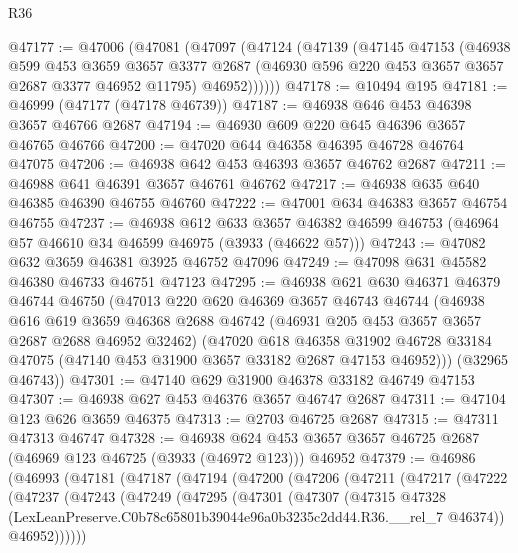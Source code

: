 \begin{lexlean}{R36}
\begin{coremodule}
@47177 := @47006
    (@47081
      (@47097
        (@47124
          (@47139
            (@47145
              @47153
              (@46938
                @599
                @453
                @3659
                @3657
                @3377
                @2687
                (@46930 @596 @220 @453 @3657 @3657 @2687 @3377 @46952 @11795)
                @46952))))))
@47178 := @10494 @195
@47181 := @46999 (@47177 (@47178 @46739))
@47187 := @46938 @646 @453 @46398 @3657 @46766 @2687
@47194 := @46930 @609 @220 @645 @46396 @3657 @46765 @46766
@47200 := @47020 @644 @46358 @46395 @46728 @46764 @47075
@47206 := @46938 @642 @453 @46393 @3657 @46762 @2687
@47211 := @46988 @641 @46391 @3657 @46761 @46762
@47217 := @46938 @635 @640 @46385 @46390 @46755 @46760
@47222 := @47001 @634 @46383 @3657 @46754 @46755
@47237 := @46938
    @612
    @633
    @3657
    @46382
    @46599
    @46753
    (@46964 @57 @46610 @34 @46599 @46975 (@3933 (@46622 @57)))
@47243 := @47082 @632 @3659 @46381 @3925 @46752 @47096
@47249 := @47098 @631 @45582 @46380 @46733 @46751 @47123
@47295 := @46938
    @621
    @630
    @46371
    @46379
    @46744
    @46750
    (@47013
      @220
      @620
      @46369
      @3657
      @46743
      @46744
      (@46938
        @616
        @619
        @3659
        @46368
        @2688
        @46742
        (@46931 @205 @453 @3657 @3657 @2687 @2688 @46952 @32462)
        (@47020
          @618
          @46358
          @31902
          @46728
          @33184
          @47075
          (@47140 @453 @31900 @3657 @33182 @2687 @47153 @46952)))
      (@32965 @46743))
@47301 := @47140 @629 @31900 @46378 @33182 @46749 @47153
@47307 := @46938 @627 @453 @46376 @3657 @46747 @2687
@47311 := @47104 @123 @626 @3659 @46375
@47313 := @2703 @46725 @2687
@47315 := @47311 @47313 @46747
@47328 := @46938
    @624
    @453
    @3657
    @3657
    @46725
    @2687
    (@46969 @123 @46725 (@3933 (@46972 @123)))
    @46952
@47379 := @46986
    (@46993
      (@47181
        (@47187
          (@47194
            (@47200
              (@47206
                (@47211
                  (@47217
                    (@47222
                      (@47237
                        (@47243
                          (@47249
                            (@47295
                              (@47301
                                (@47307
                                  (@47315
                                    @47328
                                    (LexLeanPreserve.C0b78c65801b39044e96a0b3235c2dd44.R36.__rel_7
                                      @46374))
                                  @46952))))))

\end{coremodule}
\end{lexlean}
